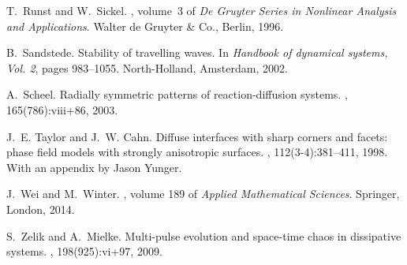 \begin{thebibliography}{10}
T.~Runst and W.~Sickel.
, volume~3 of {\em De Gruyter Series
  in Nonlinear Analysis and Applications}.
\newblock Walter de Gruyter \& Co., Berlin, 1996.

B.~Sandstede.
\newblock Stability of travelling waves.
\newblock In {\em Handbook of dynamical systems, {V}ol. 2}, pages 983--1055.
  North-Holland, Amsterdam, 2002.

A.~Scheel.
\newblock Radially symmetric patterns of reaction-diffusion systems.
, 165(786):viii+86, 2003.

J.~E. Taylor and J.~W. Cahn.
\newblock Diffuse interfaces with sharp corners and facets: phase field models
  with strongly anisotropic surfaces.
, 112(3-4):381--411, 1998.
\newblock With an appendix by Jason Yunger.

J.~Wei and M.~Winter.
, volume 189 of {\em Applied Mathematical Sciences}.
\newblock Springer, London, 2014.

S.~Zelik and A.~Mielke.
\newblock Multi-pulse evolution and space-time chaos in dissipative systems.
, 198(925):vi+97, 2009.

\end{thebibliography}
\fi



